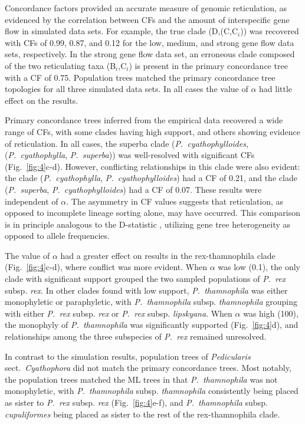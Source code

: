 \documentclass[12pt,letterpaper]{article}
\begin{document}
Concordance factors provided an accurate measure of genomic
reticulation, as evidenced by the correlation between CFs and the
amount of interspecific gene flow in simulated data sets. For example,
the true clade (D,(C,C$_i$)) was recovered with CFs of 0.99, 0.87, and
0.12 for the low, medium, and strong gene flow data sets,
respectively. In the strong gene flow data set, an erroneous clade
composed of the two reticulating taxa (B$_i$,C$_i$) is present in the
primary concordance tree with a CF of 0.75.  Population trees matched
the primary concordance tree topologies for all three simulated data
sets. In all cases the value of $\alpha$ had little effect on the
results.

Primary concordance trees inferred from the empirical data recovered a
wide range of CFs, with some clades having high support, and others
showing evidence of reticulation. In all cases, the superba clade
(\emph{P.~cyathophylloides}, (\emph{P.~cyathophylla},
\emph{P.~superba})) was well-resolved with significant CFs
(Fig.~\ref{fig:4}c-d). However, conflicting relationships in this
clade were also evident: the clade (\emph{P.~cyathophylla},
\emph{P.~cyathophylloides}) had a CF of 0.21, and the clade
(\emph{P.~superba}, \emph{P.~cyathophylloides}) had a CF of
0.07. These results were independent of $\alpha$. The asymmetry in CF
values suggests that reticulation, as opposed to incomplete lineage
sorting alone, may have occurred. This comparison is in 
principle analogous to the D-statistic \citep{ane_reconstructing_2010,chung_comparing_2011},
utilizing gene tree heterogeneity as opposed to allele frequencies.

The value of $\alpha$ had a greater effect on results in the
rex-thamnophila clade (Fig.~\ref{fig:4}c-d), where conflict was more
evident.  When $\alpha$ was low (0.1), the only clade with significant
support grouped the two sampled populations of \emph{P.~rex}
subsp. \emph{rex}. In other clades found with low support,
\emph{P.~thamnophila} was either monophyletic or paraphyletic, with
\emph{P.~thamnophila} subsp. \emph{thamnophila} grouping with either
\emph{P.~rex} subsp. \emph{rex} or \emph{P.~rex}
subsp. \emph{lipskyana}.  When $\alpha$ was high (100), the monophyly
of \emph{P.~thamnophila} was significantly supported
(Fig.~\ref{fig:4}d), and relationships among the three subspecies of
\emph{P.~rex} remained unresolved.

In contrast to the simulation results, population trees of
\emph{Pedicularis} sect.\ \emph{Cyathophora} did not match the primary
concordance trees. Most notably, the population trees matched the ML
trees in that \emph{P.~thamnophila} was not monophyletic, with
\emph{P.~thamnophila} subsp. \emph{thamnophila} consistently being
placed as sister to \emph{P.~rex} subsp. \emph{rex}
(Fig.~\ref{fig:4}e-f), and \emph{P.~thamnophila}
subsp. \emph{cupuliformes} being placed as sister to the rest of the
rex-thamnophila clade.
\end{document}
